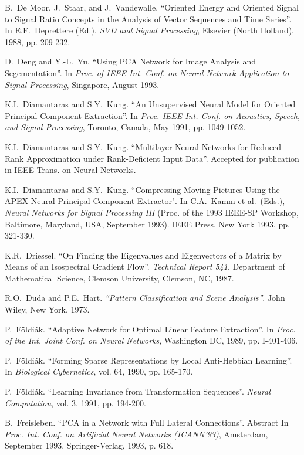 \begin{thebibliography}{999}
B.~De Moor, J.~Staar, and J.~Vandewalle.
``Oriented Energy and Oriented Signal to Signal Ratio Concepts in
the Analysis of Vector Sequences and Time Series''.
In E.F.~Deprettere (Ed.), {\em SVD and Signal Processing},
Elsevier (North Holland), 1988, pp.  209-232.

D.~Deng and Y.-L.~Yu.
``Using PCA Network for Image Analysis and Segementation''.
In {\em Proc. of IEEE Int. Conf. on Neural Network Application to Signal
Processing}, Singapore, August 1993. 
 
K.I.~Diamantaras and S.Y.~Kung.
``An Unsupervised Neural Model for Oriented Principal Component Extraction''.
In {\em Proc. IEEE Int. Conf. on Acoustics, Speech, and
Signal Processing}, Toronto, Canada, May 1991, pp. 1049-1052.
  
K.I.~Diamantaras and S.Y.~Kung.
``Multilayer Neural Networks for Reduced Rank Approximation under
Rank-Deficient Input Data''.
Accepted for publication in IEEE Trans. on Neural Networks.

K.I.~Diamantaras and S.Y.~Kung.
``Compressing Moving Pictures Using the APEX Neural Principal Component
Extractor".
In C.A.~Kamm et al.\ (Eds.), {\em Neural Networks for Signal
Processing III} (Proc. of the 1993 IEEE-SP Workshop, Baltimore, Maryland,
USA, September 1993). IEEE Press, New York 1993, pp. 321-330.
  
K.R.~Driessel.
``On Finding the Eigenvalues and Eigenvectors of a Matrix by
Means of an Isospectral Gradient Flow''.
{\em Technical Report 541}, Department of Mathematical Science, 
Clemson University, Clemson, NC, 1987.

R.O.~Duda and P.E.~Hart.
{\em ``Pattern Classification and Scene Analysis''}.
John Wiley, New York, 1973.
 
P.~F\"oldi\'ak.
``Adaptive Network for Optimal Linear Feature Extraction''.
In {\em Proc. of the Int. Joint Conf. on Neural Networks}, 
Washington DC, 1989, pp. I-401-406.
 
P.~F\"oldi\'ak.
``Forming Sparse Representations by Local Anti-Hebbian Learning''.
In {\em Biological Cybernetics}, vol. 64, 1990, pp. 165-170.
 
P.~F\"oldi\'ak.
``Learning Invariance from Transformation Sequences''.
{\em Neural Computation}, vol. 3, 1991, pp. 194-200.

B.~Freisleben.
``PCA in a Network with Full Lateral Connections''.
Abstract In {\em Proc. Int. Conf. on Artificial Neural Networks (ICANN'93)},
Amsterdam, September 1993. Springer-Verlag, 1993, p. 618.
 

\end{thebibliography}
